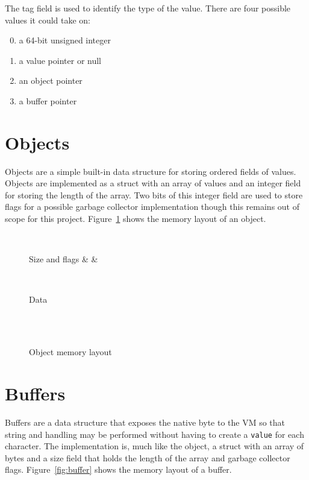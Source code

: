 \documentclass[english,a4paper]{report}
\begin{document}
The tag field is used to identify the type of the value. There are
four possible values it could take on:
\begin{enumerate}
	\setcounter{enumi}{-1}
	\item a 64-bit unsigned integer
	\item a value pointer or null
	\item an object pointer \setcounter{enumi}{3}
	\item a buffer pointer
\end{enumerate}

\section{Objects}

Objects are a simple built-in data structure for storing ordered
fields of values. Objects are implemented as a struct with an array of
values and an integer field for storing the length of the array. Two
bits of this integer field are used to store flags for a possible
garbage collector implementation though this remains out of scope for
this project. Figure~\ref{fig:objmem} shows the memory layout of an
object.

\begin{figure}
	\centering
	\begin{bytefield}[bitwidth=0.3em]{64}
		 \\
		\begin{rightwordgroup}{Size and flags}
			 & \bitbox{1}{} & 
		\end{rightwordgroup} \\
		
		\begin{rightwordgroup}{Data}
				\\
			 \\[1ex]
		\end{rightwordgroup} \\
	\end{bytefield}
	\caption{Object memory layout}
	\label{fig:objmem}
\end{figure}

\section{Buffers}

Buffers are a data structure that exposes the native byte to the VM so
that string and handling may be performed without having to create a
\verb|value| for each character. The implementation is, much like the
object, a struct with an array of bytes and a size field that holds
the length of the array and garbage collector
flags. Figure~\ref{fig:buffer} shows the memory layout of a buffer.
\end{document}

